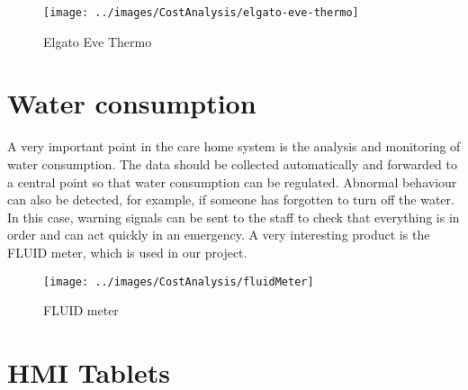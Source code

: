 \begin{figure}[h]
	\centering
	\texttt{[image: ../images/CostAnalysis/elgato-eve-thermo]} 
	\caption{Elgato Eve Thermo}
	\label{fig:elgatoEve}
\end{figure}

\section{Water consumption}
A very important point in the care home system is the analysis and monitoring of water consumption. The data should be collected automatically and forwarded to a central point so that water consumption can be regulated. Abnormal behaviour can also be detected, for example, if someone has forgotten to turn off the water. In this case, warning signals can be sent to the staff to check that everything is in order and can act quickly in an emergency. A very interesting product is the FLUID meter, which is used in our project.

\begin{figure}[h]
	\centering
	\texttt{[image: ../images/CostAnalysis/fluidMeter]} 
	\caption{FLUID meter}
	\label{fig:fluidMeter}
\end{figure}

\section{HMI Tablets}
